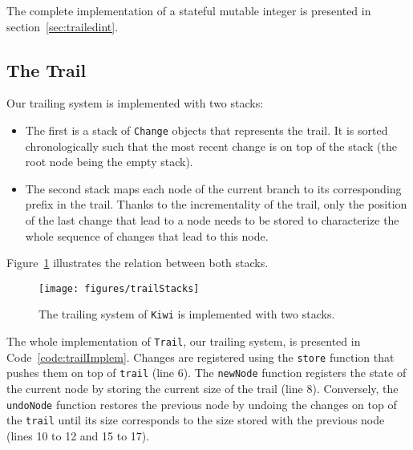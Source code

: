 \documentclass{llncs}
\newcommand{\fig}[1]{Figure~\ref{fig:#1}}
\begin{document}
\noindent
The complete implementation of a stateful mutable integer is presented in section~\ref{sec:trailedint}.

\subsection{The Trail}

Our trailing system is implemented with two stacks:
\begin{itemize}
  \item The first is a stack of \texttt{Change} objects that represents the trail.
  It is sorted chronologically such that the most recent change is on top of the stack (the root node being the empty stack).
  \item The second stack maps each node of the current branch to its corresponding prefix in the trail. 
  Thanks to the incrementality of the trail, only the position of the last change that lead to a node needs to be stored to characterize the whole sequence of changes that lead to this node. 
\end{itemize}

\noindent
\fig{trailStacks} illustrates the relation between both stacks. 

\begin{figure}
    \centering
    \texttt{[image: figures/trailStacks]}
    \caption{The trailing system of \texttt{Kiwi} is implemented with two stacks.}
    \label{fig:trailStacks}
\end{figure}

The whole implementation of \texttt{Trail}, our trailing system, is presented in Code~\ref{code:trailImplem}. 
Changes are registered using the \texttt{store} function that pushes them on top of \texttt{trail} (line 6).
The \texttt{newNode} function registers the state of the current node by storing the current size of the trail (line 8). 
Conversely, the \texttt{undoNode} function restores the previous node by undoing the changes on top of the \texttt{trail} until its size corresponds to the size stored with the previous node (lines 10 to 12 and 15 to 17).
\end{document}
